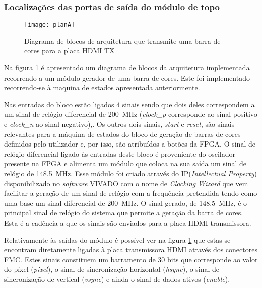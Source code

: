 \subsubsection*{Localizações das portas de saída do módulo de topo} 

\begin{figure}[h!]
	\begin{center}
		\leavevmode
		\texttt{[image: planA]}
		\caption{Diagrama de blocos de arquitetura que transmite uma barra de cores para a placa HDMI TX}
		\label{fig:planA}
	\end{center}
\end{figure}

Na figura \ref{fig:planA} é apresentado um diagrama de blocos da arquitetura implementada recorrendo a um módulo gerador de uma barra de cores. Este foi implementado recorrendo-se à maquina de estados apresentada anteriormente.

Nas entradas do bloco estão ligados 4 sinais sendo que dois deles correspondem a um sinal de relógio diferencial de \SI{200}{\mega\hertz} (\textit{clock\_p} corresponde ao sinal positivo e \textit{clock\_n} ao sinal negativo),. Os outros dois sinais, \textit{start} e \textit{reset}, são sinais relevantes para a máquina de estados do bloco de geração de barras de cores definidos pelo utilizador e, por isso, são atribuídos a botões da FPGA. O sinal de relógio diferencial ligado às entradas deste bloco é proveniente do oscilador presente na FPGA e alimenta um módulo que coloca na sua saída um sinal de relógio de \SI{148.5}{\mega\hertz}. Esse módulo foi criado através do IP(\textit{Intellectual Property}) disponibilizado no \textit{software} VIVADO com o nome de \textit{Clocking Wizard} que vem facilitar a geração de um sinal de relógio com a frequência pretendida tendo como uma base um sinal diferencial de \SI{200}{\mega\hertz}. O sinal gerado, de \SI{148.5}{\mega\hertz}, é o principal sinal de relógio do sistema que permite a geração da barra de cores. Esta é a cadência a que os sinais são enviados para a placa HDMI transmissora.

Relativamente às saídas do módulo é possível ver na figura \ref{fig:planA} que estas se encontram diretamente ligadas à placa transmissora HDMI através dos conectores FMC. Estes sinais constituem um barramento de 30 bits que corresponde ao valor do píxel (\textit{pixel}), o sinal de sincronização horizontal (\textit{hsync}), o sinal de sincronização de vertical (\textit{vsync}) e ainda o sinal de dados ativos (\textit{enable}).

